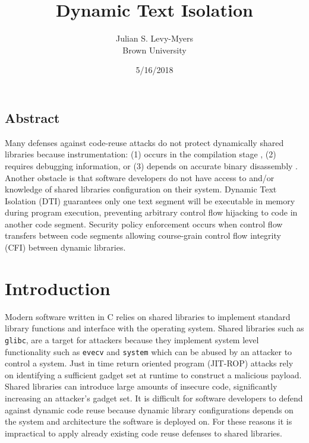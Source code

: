 \documentclass[letterpaper,twocolumn,10pt]{article}
\begin{document}
\date{5/16/2018}

\title{\Large \bf Dynamic Text Isolation}

\author{
{\rm Julian S. Levy-Myers}\\
Brown University
} %

\maketitle

\thispagestyle{empty}


\subsection*{Abstract}
Many defenses against code-reuse attacks do not protect dynamically shared libraries because instrumentation: (1) occurs in the compilation stage \cite{Readactor} \cite{compilerassisted}, (2) requires debugging information, or (3) depends on accurate binary disassembly \cite{Heisenbyte}. Another obstacle is that software developers do not have access to and/or knowledge of shared libraries configuration on their system. Dynamic Text Isolation (DTI) guarantees only one text segment will be executable in memory during program execution, preventing arbitrary control flow hijacking to code in another code segment. Security policy enforcement occurs when control flow transfers between code segments allowing course-grain control flow integrity (CFI) between dynamic libraries. 


\section{Introduction}

Modern software written in C relies on shared libraries to implement standard library functions and interface with the operating system. Shared libraries such as {\tt glibc}, are a target for attackers because they implement system level functionality such as {\tt evecv} and {\tt system} which can be abused by an attacker to  control a system. Just in time return oriented program (JIT-ROP) attacks rely on identifying a sufficient gadget set at runtime to construct a malicious payload. Shared libraries can introduce large amounts of insecure code, significantly increasing an attacker's gadget set. It is difficult for software developers to defend against dynamic code reuse because dynamic library configurations depends on the system and architecture the software is deployed on. For these reasons it is impractical to apply already existing code reuse defenses to shared libraries. 
\end{document}
